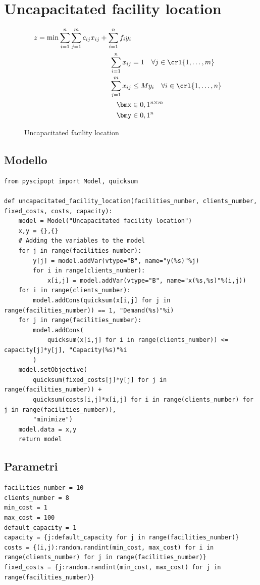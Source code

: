 \documentclass[\main/main.tex]{subfiles}
\begin{document}
\chapter{Uncapacitated facility location}

\begin{figure}
    \begin{align*}
        z = \min \sum_{i=1}^n \sum_{j=1}^m c_{ij} x_{ij} + \sum_{i=1}^n f_i y_i\\
        \sum_{i=1}^n x_{ij} &= 1 \quad \forall j \in \crl{1, \ldots, m}\\
        \sum_{j=1}^m x_{ij} &\leq M y_i \quad \forall i \in \crl{1, \ldots, n}\\
        \bmx &\in {0,1}^{n\times m}\\
        \bmy &\in {0,1}^n
    \end{align*}
    \caption{Uncapacitated facility location}
\end{figure}

\section{Modello}
\begin{verbatim}
from pyscipopt import Model, quicksum

def uncapacitated_facility_location(facilities_number, clients_number, fixed_costs, costs, capacity):
    model = Model("Uncapacitated facility location")
    x,y = {},{}
    # Adding the variables to the model
    for j in range(facilities_number):
        y[j] = model.addVar(vtype="B", name="y(%s)"%j)
        for i in range(clients_number):
            x[i,j] = model.addVar(vtype="B", name="x(%s,%s)"%(i,j))
    for i in range(clients_number):
        model.addCons(quicksum(x[i,j] for j in range(facilities_number)) == 1, "Demand(%s)"%i)
    for j in range(facilities_number):
        model.addCons(
            quicksum(x[i,j] for i in range(clients_number)) <= capacity[j]*y[j], "Capacity(%s)"%i
        )
    model.setObjective(
        quicksum(fixed_costs[j]*y[j] for j in range(facilities_number)) +
        quicksum(costs[i,j]*x[i,j] for i in range(clients_number) for j in range(facilities_number)),
        "minimize")
    model.data = x,y
    return model
\end{verbatim}
\clearpage
\section{Parametri}
\begin{verbatim}
facilities_number = 10
clients_number = 8
min_cost = 1
max_cost = 100
default_capacity = 1
capacity = {j:default_capacity for j in range(facilities_number)}
costs = {(i,j):random.randint(min_cost, max_cost) for i in range(clients_number) for j in range(facilities_number)}
fixed_costs = {j:random.randint(min_cost, max_cost) for j in range(facilities_number)}
\end{verbatim}
\end{document}
